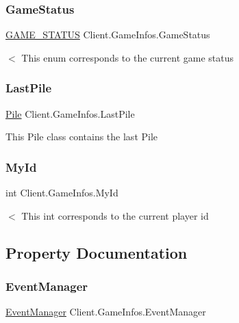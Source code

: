 \subsubsection{\texorpdfstring{Game\+Status}{GameStatus}}
{\footnotesize\ttfamily \hyperlink{namespace_server_a2b496a25969b5c46d373f7079fac645f}{G\+A\+M\+E\+\_\+\+S\+T\+A\+T\+US} Client.\+Game\+Infos.\+Game\+Status}

$<$ This enum corresponds to the current game status \mbox{\label{class_client_1_1_game_infos_a59c87f768e5324e97379e687c2570bf5}} 
\subsubsection{\texorpdfstring{Last\+Pile}{LastPile}}
{\footnotesize\ttfamily \hyperlink{class_game_1_1_pile}{Pile} Client.\+Game\+Infos.\+Last\+Pile}

This Pile class contains the last Pile \mbox{\label{class_client_1_1_game_infos_a2c299a5f0e89e0e7488aa5e29734563b}} 
\subsubsection{\texorpdfstring{My\+Id}{MyId}}
{\footnotesize\ttfamily int Client.\+Game\+Infos.\+My\+Id}

$<$ This int corresponds to the current player id 

\subsection{Property Documentation}
\mbox{\label{class_client_1_1_game_infos_ac6fb690cf0d16adee7f7354e2f0248bb}} 
\subsubsection{\texorpdfstring{Event\+Manager}{EventManager}}
{\footnotesize\ttfamily \hyperlink{class_client_1_1_event_manager}{Event\+Manager} Client.\+Game\+Infos.\+Event\+Manager\hspace{0.3cm}{\ttfamily [get]}}

